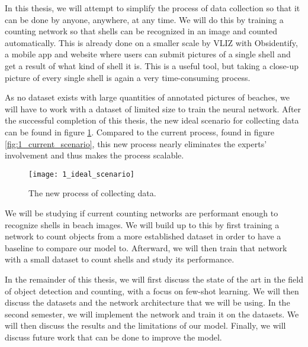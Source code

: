 In this thesis, we will attempt to simplify the process of data collection so that it can be done by anyone, anywhere, at any time. We will do this by training a counting network so that shells can be recognized in an image and counted automatically. This is already done on a smaller scale by VLIZ with Obsidentify, a mobile app and website where users can submit pictures of a single shell and get a result of what kind of shell it is. This is a useful tool, but taking a close-up picture of every single shell is again a very time-consuming process. 

As no dataset exists with large quantities of annotated pictures of beaches, we will have to work with a dataset of limited size to train the neural network. After the successful completion of this thesis, the new ideal scenario for collecting data can be found in figure \ref{fig:1_ideal_scenario}. Compared to the current process, found in figure \ref{fig:1_current_scenario}, this new process nearly eliminates the experts' involvement and thus makes the process scalable.

\begin{figure}[h]
	\centering
	\texttt{[image: 1\_ideal\_scenario]}
	\caption{The new process of collecting data.}
	\label{fig:1_ideal_scenario}
\end{figure}

We will be studying if current counting networks are performant enough to recognize shells in beach images. We will build up to this by first training a network to count objects from a more established dataset in order to have a baseline to compare our model to. Afterward, we will then train that network with a small dataset to count shells and study its performance.

In the remainder of this thesis, we will first discuss the state of the art in the field of object detection and counting, with a focus on few-shot learning. We will then discuss the datasets and the network architecture that we will be using. In the second semester, we will implement the network and train it on the datasets. We will then discuss the results and the limitations of our model. Finally, we will discuss future work that can be done to improve the model.